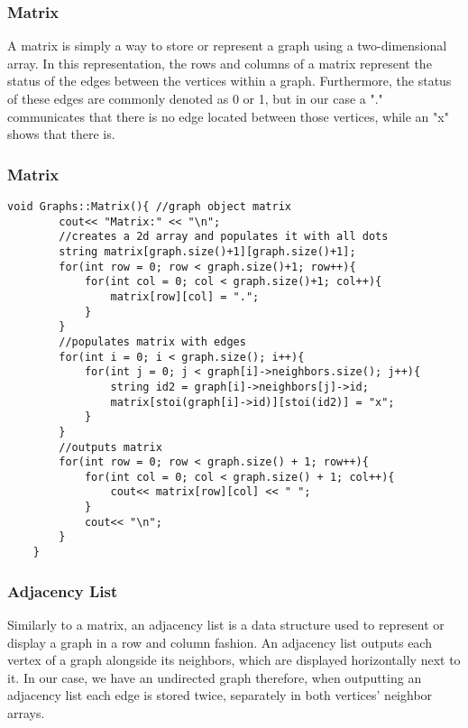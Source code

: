 \documentclass[letterpaper, 10pt,DIV=13]{scrartcl}
\numberwithin{equation}{section} %
\numberwithin{figure}{section} %
\numberwithin{table}{section} %
\begin{document}
\pagebreak

\subsubsection{Matrix}
A matrix is simply a way to store or represent a graph using a two-dimensional array. In this representation, the rows and columns of a matrix represent the status of the edges between the vertices within a graph. Furthermore, the status of these edges are commonly denoted as 0 or 1, but in our case a "." communicates that there is no edge located between those vertices, while an "x" shows that there is.

\subsubsection*{Matrix}
    \lstset{numbers=left, numberstyle=\tiny, stepnumber=1, numbersep=5pt, basicstyle=\footnotesize\ttfamily}
    \begin{lstlisting}[frame=single, ]
   void Graphs::Matrix(){ //graph object matrix
        cout<< "Matrix:" << "\n";
        //creates a 2d array and populates it with all dots
        string matrix[graph.size()+1][graph.size()+1];
        for(int row = 0; row < graph.size()+1; row++){
            for(int col = 0; col < graph.size()+1; col++){
                matrix[row][col] = ".";
            }
        }
        //populates matrix with edges
        for(int i = 0; i < graph.size(); i++){
            for(int j = 0; j < graph[i]->neighbors.size(); j++){
                string id2 = graph[i]->neighbors[j]->id;
                matrix[stoi(graph[i]->id)][stoi(id2)] = "x";
            }
        }
        //outputs matrix
        for(int row = 0; row < graph.size() + 1; row++){
            for(int col = 0; col < graph.size() + 1; col++){
                cout<< matrix[row][col] << " ";
            }
            cout<< "\n";
        }
    }

\end{lstlisting}

\subsubsection{Adjacency List}
Similarly to a matrix, an adjacency list is a data structure used to represent or display a graph in a row and column fashion. An adjacency list outputs each vertex of a graph alongside its neighbors, which are displayed horizontally next to it. In our case, we have an undirected graph therefore, when outputting an adjacency list each edge is stored twice, separately in both vertices' neighbor arrays.
\end{document}
